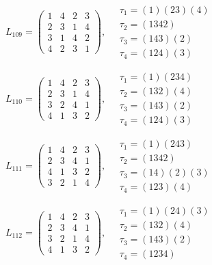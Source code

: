 $L_{109} = \begin{pmatrix} 1 & 4 & 2 & 3 \\ 2 & 3 & 1 & 4 \\ 3 & 1 & 4 & 2 \\ 4 & 2 & 3 & 1 \end{pmatrix}, \quad \begin{matrix} \tau_{1} = (1)(2 3)(4) \\ \tau_{2} = (1 3 4 2) \\ \tau_{3} = (1 4 3)(2) \\ \tau_{4} = (1 2 4)(3) \end{matrix}$

$L_{110} = \begin{pmatrix} 1 & 4 & 2 & 3 \\ 2 & 3 & 1 & 4 \\ 3 & 2 & 4 & 1 \\ 4 & 1 & 3 & 2 \end{pmatrix}, \quad \begin{matrix} \tau_{1} = (1)(2 3 4) \\ \tau_{2} = (1 3 2)(4) \\ \tau_{3} = (1 4 3)(2) \\ \tau_{4} = (1 2 4)(3) \end{matrix}$

$L_{111} = \begin{pmatrix} 1 & 4 & 2 & 3 \\ 2 & 3 & 4 & 1 \\ 4 & 1 & 3 & 2 \\ 3 & 2 & 1 & 4 \end{pmatrix}, \quad \begin{matrix} \tau_{1} = (1)(2 4 3) \\ \tau_{2} = (1 3 4 2) \\ \tau_{3} = (1 4)(2)(3) \\ \tau_{4} = (1 2 3)(4) \end{matrix}$

$L_{112} = \begin{pmatrix} 1 & 4 & 2 & 3 \\ 2 & 3 & 4 & 1 \\ 3 & 2 & 1 & 4 \\ 4 & 1 & 3 & 2 \end{pmatrix}, \quad \begin{matrix} \tau_{1} = (1)(2 4)(3) \\ \tau_{2} = (1 3 2)(4) \\ \tau_{3} = (1 4 3)(2) \\ \tau_{4} = (1 2 3 4) \end{matrix}$

